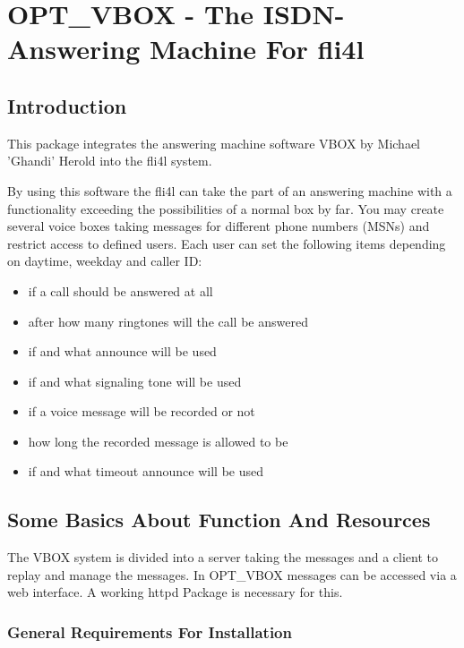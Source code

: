 {
\section {OPT\_VBOX - The ISDN-Answering Machine For fli4l}
}

\subsection{Introduction}

This package integrates the answering machine software VBOX by 
Michael ’Ghandi’ Herold into the fli4l system.

By using this software the fli4l can take the part of an answering machine with
a functionality exceeding the possibilities of a normal box by far. You may create
several voice boxes taking messages for different phone numbers (MSNs) and restrict
access to defined users. Each user can set the following items depending on daytime,
weekday and caller ID:

\begin{itemize}
    \item if a call should be answered at all
    \item after how many ringtones will the call be answered
    \item if and what announce will be used
    \item if and what signaling tone will be used
    \item if a voice message will be recorded or not
    \item how long the recorded message is allowed to be
    \item if and what timeout announce will be used
\end{itemize}

\subsection{Some Basics About Function And Resources}

The VBOX system is divided into a server taking the messages and a client to
replay and manage the messages. In OPT\_VBOX messages can be accessed via a web
interface. A working httpd Package is necessary for this. 

\subsubsection{General Requirements For Installation}

